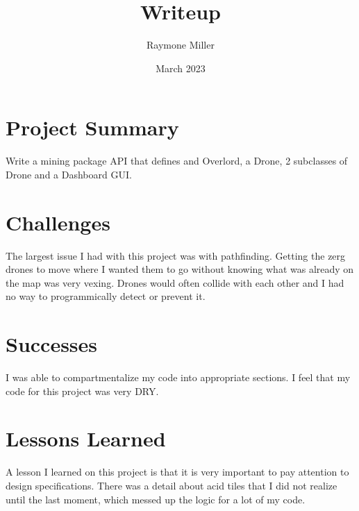 \documentclass{article}
\title{Writeup}
\author{Raymone Miller}
\date{March 2023}
\begin{document}
    \maketitle

    \section*{Project Summary}
        Write a mining package API that defines and Overlord, a Drone, 2
    subclasses of Drone and a Dashboard GUI.

    \section*{Challenges}
        The largest issue I had with this project was with pathfinding.
    Getting the zerg drones to move where I wanted them to go without
    knowing what was already on the map was very vexing. Drones would
    often collide with each other and I had no way to programmically
    detect or prevent it.

    \section*{Successes}
        I was able to compartmentalize my code into appropriate sections.
    I feel that my code for this project was very DRY.

    \section*{Lessons Learned}
        A lesson I learned on this project is that it is very important
    to pay attention to design specifications. There was a detail about
    acid tiles that I did not realize until the last moment, which messed
    up the logic for a lot of my code.
\end{document}

